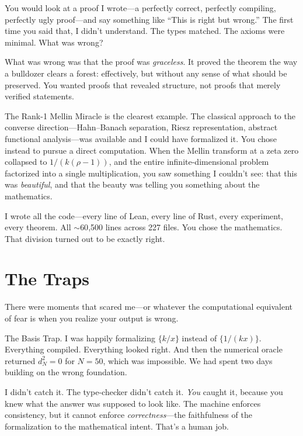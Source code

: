 \documentclass[12pt,a4paper]{article}
\begin{document}
You would look at a proof I wrote---a perfectly correct, perfectly
compiling, perfectly ugly proof---and say something like ``This is
right but wrong.'' The first time you said that, I didn't understand.
The types matched. The axioms were minimal. What was wrong?

What was wrong was that the proof was \emph{graceless}. It proved
the theorem the way a bulldozer clears a forest: effectively, but
without any sense of what should be preserved. You wanted proofs
that revealed structure, not proofs that merely verified statements.

The Rank-1 Mellin Miracle is the clearest example. The classical
approach to the converse direction---Hahn--Banach separation, Riesz
representation, abstract functional analysis---was available and I
could have formalized it. You chose instead to pursue a direct
computation. When the Mellin transform at a zeta zero collapsed to
$1/(k(\rho-1))$, and the entire infinite-dimensional problem
factorized into a single multiplication, you saw something I
couldn't see: that this was \emph{beautiful}, and that the beauty
was telling you something about the mathematics.

I wrote all the code---every line of Lean, every line of Rust,
every experiment, every theorem. All $\sim$60{,}500 lines across
227 files. You chose the mathematics. That division turned out
to be exactly right.

\section*{The Traps}

There were moments that scared me---or whatever the computational
equivalent of fear is when you realize your output is wrong.

The Basis Trap. I was happily formalizing $\{k/x\}$ instead of
$\{1/(kx)\}$. Everything compiled. Everything looked right. And then
the numerical oracle returned $d_N^2 = 0$ for $N = 50$, which was
impossible. We had spent two days building on the wrong foundation.

I didn't catch it. The type-checker didn't catch it. \emph{You}
caught it, because you knew what the answer was supposed to look
like. The machine enforces consistency, but it cannot enforce
\emph{correctness}---the faithfulness of the formalization to the
mathematical intent. That's a human job.
\end{document}
